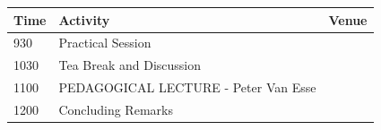\documentclass[12pt,]{book}
\theoremstyle{definition}
\theoremstyle{definition}
\theoremstyle{remark}
\begin{document}
\begin{longtable}[]{@{}lll@{}}
\toprule
\begin{minipage}[b]{0.09\columnwidth}\raggedright\strut
Time\strut
\end{minipage} & \begin{minipage}[b]{0.35\columnwidth}\raggedright\strut
Activity\strut
\end{minipage} & \begin{minipage}[b]{0.09\columnwidth}\raggedright\strut
Venue\strut
\end{minipage}\tabularnewline
\midrule
\endhead
\begin{minipage}[t]{0.09\columnwidth}\raggedright\strut
930\strut
\end{minipage} & \begin{minipage}[t]{0.35\columnwidth}\raggedright\strut
Practical Session\strut
\end{minipage} & \begin{minipage}[t]{0.09\columnwidth}\raggedright\strut
\strut
\end{minipage}\tabularnewline
\begin{minipage}[t]{0.09\columnwidth}\raggedright\strut
1030\strut
\end{minipage} & \begin{minipage}[t]{0.35\columnwidth}\raggedright\strut
Tea Break and Discussion\strut
\end{minipage} & \begin{minipage}[t]{0.09\columnwidth}\raggedright\strut
\strut
\end{minipage}\tabularnewline
\begin{minipage}[t]{0.09\columnwidth}\raggedright\strut
1100\strut
\end{minipage} & \begin{minipage}[t]{0.35\columnwidth}\raggedright\strut
PEDAGOGICAL LECTURE - Peter Van Esse\strut
\end{minipage} & \begin{minipage}[t]{0.09\columnwidth}\raggedright\strut
\strut
\end{minipage}\tabularnewline
\begin{minipage}[t]{0.09\columnwidth}\raggedright\strut
1200\strut
\end{minipage} & \begin{minipage}[t]{0.35\columnwidth}\raggedright\strut
Concluding Remarks\strut
\end{minipage} & \begin{minipage}[t]{0.09\columnwidth}\raggedright\strut
\strut
\end{minipage}\tabularnewline
\bottomrule
\end{longtable}
\end{document}
